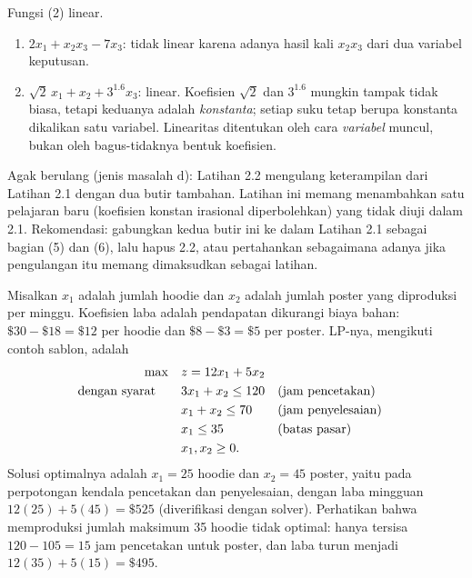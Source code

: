 
Fungsi (2) linear.
\begin{enumerate}
\item $2x_1 + x_2 x_3 - 7x_3$: tidak linear karena adanya hasil kali $x_2 x_3$ dari dua variabel keputusan.
\item $\sqrt{2}\,x_1 + x_2 + 3^{1.6} x_3$: linear. Koefisien $\sqrt{2}$ dan $3^{1.6}$ mungkin tampak tidak biasa, tetapi keduanya adalah \emph{konstanta}; setiap suku tetap berupa konstanta dikalikan satu variabel. Linearitas ditentukan oleh cara \emph{variabel} muncul, bukan oleh bagus-tidaknya bentuk koefisien.
\end{enumerate}

\begin{qaflag}
Agak berulang (jenis masalah d): Latihan 2.2 mengulang keterampilan dari Latihan 2.1 dengan dua butir tambahan. Latihan ini memang menambahkan satu pelajaran baru (koefisien konstan irasional diperbolehkan) yang tidak diuji dalam 2.1. Rekomendasi: gabungkan kedua butir ini ke dalam Latihan 2.1 sebagai bagian (5) dan (6), lalu hapus 2.2, atau pertahankan sebagaimana adanya jika pengulangan itu memang dimaksudkan sebagai latihan.
\end{qaflag}


Misalkan $x_1$ adalah jumlah hoodie dan $x_2$ adalah jumlah poster yang diproduksi per minggu. Koefisien laba adalah pendapatan dikurangi biaya bahan: $\$30 - \$18 = \$12$ per hoodie dan $\$8 - \$3 = \$5$ per poster. LP-nya, mengikuti contoh sablon, adalah
\begin{align*}
\max \quad & z = 12x_1 + 5x_2\\
\mbox{dengan syarat}\quad \quad & 3x_1 + x_2 \leq 120 && \mbox{(jam pencetakan)}\\
& x_1 + x_2 \leq 70 && \mbox{(jam penyelesaian)}\\
& x_1 \leq 35 && \mbox{(batas pasar)}\\
& x_1, x_2 \geq 0.
\end{align*}
Solusi optimalnya adalah $x_1 = 25$ hoodie dan $x_2 = 45$ poster, yaitu pada perpotongan kendala pencetakan dan penyelesaian, dengan laba mingguan $12(25) + 5(45) = \$525$ (diverifikasi dengan solver). Perhatikan bahwa memproduksi jumlah maksimum 35 hoodie tidak optimal: hanya tersisa $120 - 105 = 15$ jam pencetakan untuk poster, dan laba turun menjadi $12(35) + 5(15) = \$495$.


